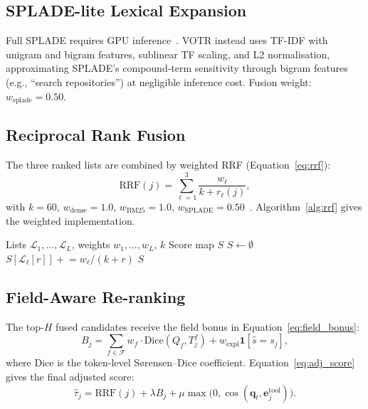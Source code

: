 \documentclass[sigconf,anonymous,review]{acmart}
\newcommand{\votr}{\textsc{VOTR}\xspace}
\begin{document}
\subsection{SPLADE-lite Lexical Expansion}
Full SPLADE requires GPU inference~\cite{formal2021splade}.
\votr instead uses TF-IDF with unigram and bigram features, sublinear TF scaling,
and L2 normalisation, approximating SPLADE's compound-term sensitivity through
bigram features (e.g., ``search repositories'') at negligible inference cost.
Fusion weight: $w_{\mathrm{splade}}=0.50$.

\subsection{Reciprocal Rank Fusion}
The three ranked lists are combined by weighted RRF (Equation~\eqref{eq:rrf}):
\begin{equation}
\label{eq:rrf}
  \mathrm{RRF}(j)=\sum_{\ell=1}^{3}\frac{w_\ell}{k+r_\ell(j)},
\end{equation}
with $k=60$, $w_{\mathrm{dense}}=1.0$, $w_{\mathrm{BM25}}=1.0$,
$w_{\mathrm{SPLADE}}=0.50$~\cite{cormack2009rrf}.
Algorithm~\ref{alg:rrf} gives the weighted implementation.

\begin{algorithm}[t]
\caption{Weighted Reciprocal Rank Fusion}
\label{alg:rrf}
\begin{algorithmic}[1]
\Require Lists $\mathcal{L}_1,\ldots,\mathcal{L}_L$, weights $w_1,\ldots,w_L$, $k$
\Ensure Score map $S$
\State $S \gets \emptyset$
    \State $S[\mathcal{L}_\ell[r]] \mathrel{+}= w_\ell/(k+r)$
  \EndFor
\EndFor
\State \Return $S$
\end{algorithmic}
\end{algorithm}

\subsection{Field-Aware Re-ranking}
The top-$H$ fused candidates receive the field bonus in
Equation~\eqref{eq:field_bonus}:
\begin{equation}
\label{eq:field_bonus}
  B_j = \sum_{f\in\mathcal{F}} w_f \cdot
  \mathrm{Dice}(Q_f,T_j^f) + w_{\mathrm{expl}}\mathbf{1}[\hat{s}=s_j],
\end{equation}
where Dice is the token-level S{\o}rensen--Dice coefficient.
Equation~\eqref{eq:adj_score} gives the final adjusted score:
\begin{equation}
\label{eq:adj_score}
  \hat{\tau}_j = \mathrm{RRF}(j) + \lambda B_j
  + \mu\max\!\bigl(0,\cos(\mathbf{q}_t,\mathbf{e}^{\mathrm{tool}}_j)\bigr).
\end{equation}
\end{document}
